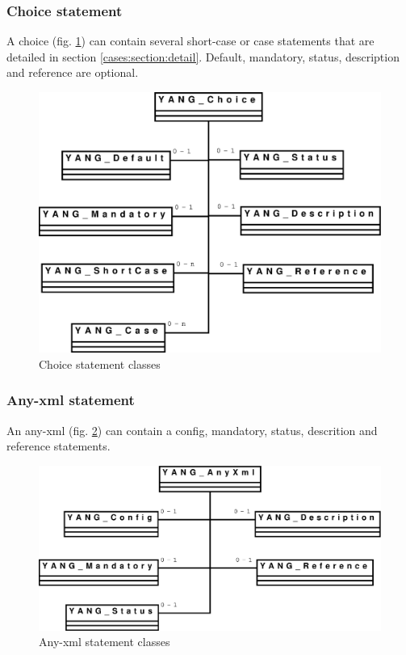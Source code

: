 \documentclass[a4paper]{article}
\begin{document}
\subsubsection{Choice statement}
\label{cases:section:global}
A choice  (fig. \ref{choice}) can  contain several short-case  or case
statements  that are  detailed in  section \ref{cases:section:detail}.
Default, mandatory, status, description and reference are optional.
\begin{figure}[htbp]
\begin{center}
\includegraphics[scale = .3]{choice.eps}
\end{center}
\caption{Choice statement classes}
\label{choice}
\end{figure}

\subsubsection{Any-xml statement}

An  any-xml (fig.  \ref{anyxml}) can  contain a  config, mandatory,
status, descrition and reference statements.
\begin{figure}[htbp]
\begin{center}
\includegraphics[scale = .3]{anyxml.eps}
\end{center}
\caption{Any-xml statement classes}
\label{anyxml}
\end{figure}
\end{document}
